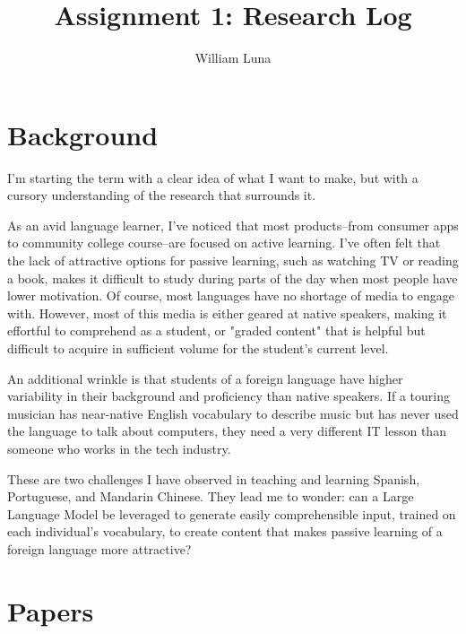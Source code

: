 \documentclass[
	letterpaper, %
]{jdf}
\author{William Luna}
\title{Assignment 1: Research Log}
\begin{document}

\maketitle

\section{Background}

I'm starting the term with a clear idea of what I want to make, but with a cursory understanding of the research that surrounds it.

As an avid language learner, I've noticed that most products–from consumer apps to community college course–are focused on active learning. I've often felt that the lack of attractive options for passive learning, such as watching TV or reading a book, makes it difficult to study during parts of the day when most people have lower motivation. Of course, most languages have no shortage of media to engage with. However, most of this media is either geared at native speakers, making it effortful to comprehend as a student, or "graded content" that is helpful but difficult to acquire in sufficient volume for the student's current level.

An additional wrinkle is that students of a foreign language have higher variability in their background and proficiency than native speakers. If a touring musician has near-native English vocabulary to describe music but has never used the language to talk about computers, they need a very different IT lesson than someone who works in the tech industry.

These are two challenges I have observed in teaching and learning Spanish, Portuguese, and Mandarin Chinese. They lead me to wonder: can a Large Language Model be leveraged to generate easily comprehensible input, trained on each individual's vocabulary, to create content that makes passive learning of a foreign language more attractive?

\section{Papers}
\end{document}
